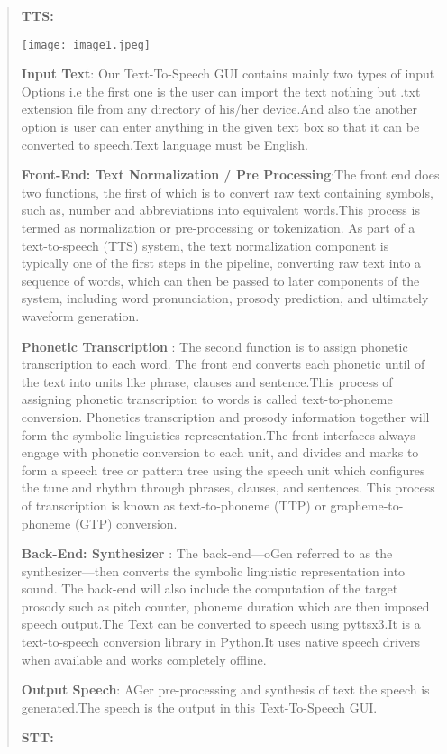 \documentclass[]{article}
\begin{document}
\begin{quote}
\textbf{TTS:}

\texttt{[image: image1.jpeg]}

\textbf{Input Text}: Our Text-To-Speech GUI contains mainly two types of
input Options i.e the ﬁrst one is the user can import the text nothing
but .txt extension ﬁle from any directory of his/her device.And also the
another option is user can enter anything in the given text box so that
it can be converted to speech.Text language must be English.

\textbf{Front-End: Text Normalization / Pre Processing}:The front end
does two functions, the ﬁrst of which is to convert raw text containing
symbols, such as, number and abbreviations into equivalent words.This
process is termed as normalization or pre-processing or tokenization. As
part of a text-to-speech (TTS) system, the text normalization component
is typically one of the ﬁrst steps in the pipeline, converting raw text
into a sequence of words, which can then be passed to later components
of the system, including word pronunciation, prosody prediction, and
ultimately waveform generation.

\textbf{Phonetic Transcription} : The second function is to assign
phonetic transcription to each word. The front end converts each
phonetic until of the text into units like phrase, clauses and
sentence.This process of assigning phonetic transcription to words is
called text-to-phoneme conversion. Phonetics transcription and prosody
information together will form the symbolic linguistics
representation.The front interfaces always engage with phonetic
conversion to each unit, and divides and marks to form a speech tree or
pattern tree using the speech unit which conﬁgures the tune and rhythm
through phrases, clauses, and sentences. This process of transcription
is known as text-to-phoneme (TTP) or grapheme-to-phoneme (GTP)
conversion.

\textbf{Back-End: Synthesizer} : The back-end---oGen referred to as the
synthesizer---then converts the symbolic linguistic representation into
sound. The back-end will also include the computation of the target
prosody such as pitch counter, phoneme duration which are then imposed
speech output.The Text can be converted to speech using pyttsx3.It is a
text-to-speech conversion library in Python.It uses native speech
drivers when available and works completely oﬄine.

\textbf{Output Speech}: AGer pre-processing and synthesis of text the
speech is generated.The speech is the output in this Text-To-Speech GUI.

\textbf{STT:}
\end{quote}
\end{document}
